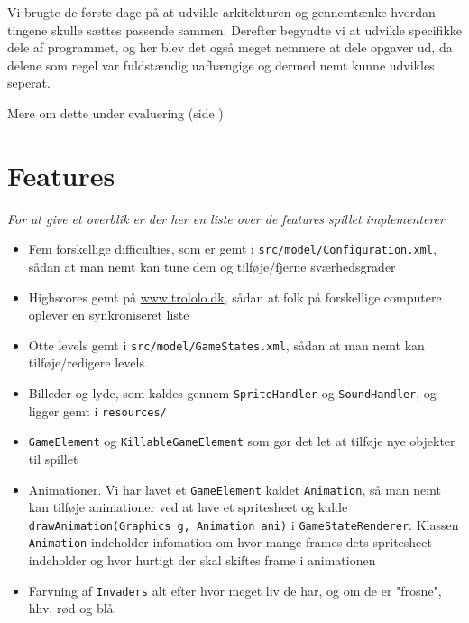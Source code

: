 \documentclass[titlepage,danish]{article}
\newcommand{\code}[1]{\texttt{#1}}
\begin{document}
Vi brugte de første dage på at udvikle arkitekturen og gennemtænke hvordan tingene skulle
sættes passende sammen. Derefter begyndte vi at udvikle specifikke dele af programmet, og her blev
det også meget nemmere at dele opgaver ud, da delene som regel var fuldstændig uafhængige og dermed
nemt kunne udvikles seperat.

Mere om dette under evaluering (side \pageref{Evaluering})

\section{Features}
\emph{For at give et overblik er der her en liste over de features spillet implementerer}

\begin{itemize}
\item Fem forskellige difficulties, som er gemt i \code{src/model/Configuration.xml}, sådan at man
  nemt kan tune dem og tilføje/fjerne sværhedsgrader
\item Highscores gemt på \url{www.trololo.dk}, sådan at folk på forskellige computere oplever en synkroniseret liste
\item Otte levels gemt i \code{src/model/GameStates.xml}, sådan at man nemt kan tilføje/redigere
  levels.
\item Billeder og lyde, som kaldes gennem \code{SpriteHandler} og \code{SoundHandler}, og ligger gemt i
  \code{resources/}
\item \code{GameElement} og \code{KillableGameElement} som gør det let at tilføje nye objekter til
  spillet
\item Animationer. Vi har lavet et \code{GameElement} kaldet \code{Animation}, så man nemt kan
  tilføje animationer ved at lave et spritesheet og kalde \code{drawAnimation(Graphics g, Animation
    ani)} i \code{GameStateRenderer}. Klassen \code{Animation} indeholder infomation om hvor mange
  frames dets spritesheet indeholder og hvor hurtigt der skal skiftes frame i animationen
\item Farvning af \code{Invaders} alt efter hvor meget liv de har, og om de er "frosne", hhv. rød og blå.
\end{itemize}
\end{document}
